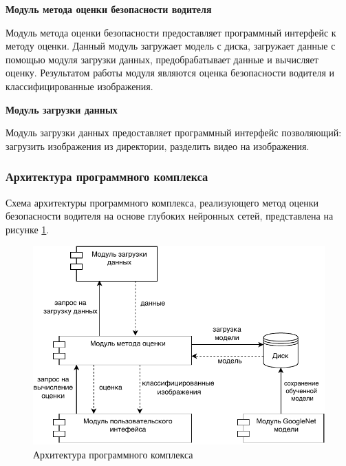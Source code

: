 \textbf{Модуль метода оценки безопасности водителя}

Модуль метода оценки безопасности предоставляет программный интерфейс к методу оценки. Данный модуль загружает модель с диска, загружает данные с помощью модуля загрузки данных, предобрабатывает данные и вычисляет оценку. Результатом работы модуля являются оценка безопасности водителя и классифицированные изображения.


\textbf{Модуль загрузки  данных}

Модуль загрузки  данных предоставляет программный интерфейс позволяющий: загрузить изображения из директории,
разделить видео на изображения.


\subsubsection{Архитектура программного комплекса}
Схема архитектуры программного комплекса, реализующего метод оценки безопасности водителя на основе глубоких
нейронных сетей, представлена на рисунке \ref{fig:arhitectura_po}.

\begin{figure}[hbtp]
	\centering
	\includegraphics[scale=1.2]{img/arhitectura_po.pdf}
	\caption{Архитектура программного комплекса}
	\label{fig:arhitectura_po}
\end{figure}
\clearpage

